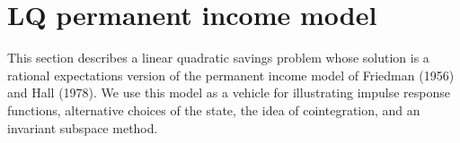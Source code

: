 %
%
 
%
%
%
%
%


\section{LQ permanent income model}\label{sec:LQmodel}%
This section describes a linear quadratic savings problem
whose solution is a rational expectations version of the permanent
income model of Friedman  (1956) and Hall (1978). We use this
model as a vehicle for illustrating impulse response functions,
alternative choices of the state, the idea of cointegration,
and an invariant subspace method.
%

